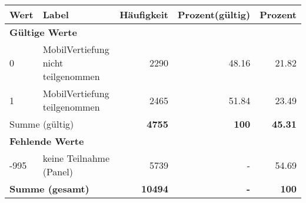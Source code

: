      \begin{longtable}{lXrrr}
     \toprule
     \textbf{Wert} & \textbf{Label} & \textbf{Häufigkeit} & \textbf{Prozent(gültig)} & \textbf{Prozent} \\
     \endhead
     \midrule
     \multicolumn{5}{l}{\textbf{Gültige Werte}}\\

     0 &
     \multicolumn{1}{X}{ MobilVertiefung nicht teilgenommen   } &


       \num{2290} &
       \num[round-mode=places,round-precision=2]{48,16} &
         \num[round-mode=places,round-precision=2]{21,82} \\

     1 &
     \multicolumn{1}{X}{ MobilVertiefung teilgenommen   } &


       \num{2465} &
       \num[round-mode=places,round-precision=2]{51,84} &
         \num[round-mode=places,round-precision=2]{23,49} \\
     \midrule
     \multicolumn{2}{l}{Summe (gültig)} &
       \textbf{\num{4755}} &
     \textbf{100} &
       \textbf{\num[round-mode=places,round-precision=2]{45,31}} \\
     \multicolumn{5}{l}{\textbf{Fehlende Werte}}\\
       -995 &
       keine Teilnahme (Panel) &
         \num{5739} &
        - &
         \num[round-mode=places,round-precision=2]{54,69} \\
     \midrule
     \multicolumn{2}{l}{\textbf{Summe (gesamt)}} &
          \textbf{\num{10494}} &
        \textbf{-} &
        \textbf{100} \\
     \bottomrule
     \end{longtable}
     
